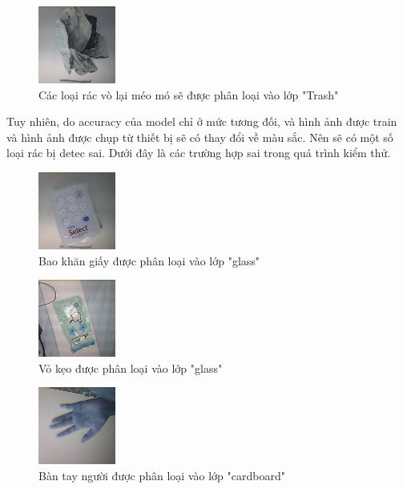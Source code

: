 \begin{figure}[H]
    \centering
    \includegraphics[width=0.25\linewidth]{images/Quanh/othertrash.bmp}
    \caption{ Các loại rác vò lại méo mó sẽ được phân loại vào lớp "Trash" }
    \label{fig:Dtrash}
\end{figure}

Tuy nhiên, do accuracy của model chỉ ở mức tương đối, và hình ảnh được train và hình ảnh được chụp từ thiết bị sẽ có thay đổi về màu sắc. Nên sẽ có một số loại rác bị detec sai. Dưới đây là các trường hợp sai trong quá trình kiểm thử.
\begin{figure}[H]
    \centering
    \includegraphics[width=0.25\linewidth]{images/Quanh/glass.bmp}
    \caption{ Bao khăn giấy được phân loại vào lớp "glass" }
    \label{fig:DWglass}
\end{figure}

\begin{figure}[H]
    \centering
    \includegraphics[width=0.25\linewidth]{images/Quanh/glassw.bmp}
    \caption{ Vỏ kẹo được phân loại vào lớp "glass" }
    \label{fig:DWglass2}
\end{figure}

\begin{figure}[H]
    \centering
    \includegraphics[width=0.25\linewidth]{images/Quanh/cardboard_W.bmp}
    \caption{ Bàn tay người được phân loại vào lớp "cardboard" }
    \label{fig:DWcardboar}
\end{figure}

